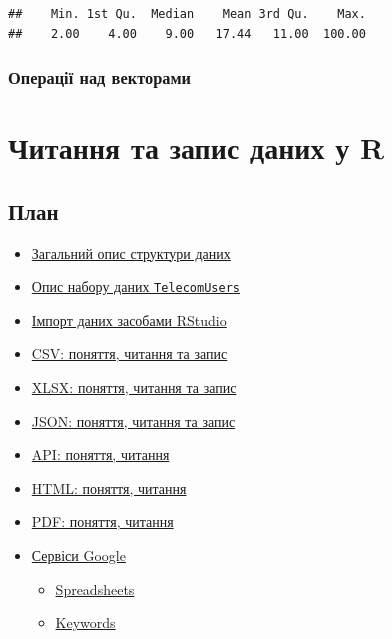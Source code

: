 \documentclass[
]{book}
\providecommand{\tightlist}{%
  \setlength{\itemsep}{0pt}\setlength{\parskip}{0pt}}
\begin{document}
\begin{verbatim}
##    Min. 1st Qu.  Median    Mean 3rd Qu.    Max. 
##    2.00    4.00    9.00   17.44   11.00  100.00
\end{verbatim}

\hypertarget{chapter323}{%
\subsection{Операції над векторами}\label{chapter323}}

\hypertarget{chapter4}{%
\chapter{Читання та запис даних у R}\label{chapter4}}

\hypertarget{ux43fux43bux430ux43d-3}{%
\section*{План}\label{ux43fux43bux430ux43d-3}}

\begin{itemize}
\tightlist
\item
  \protect\hyperlink{chapter41}{Загальний опис структури даних}
\item
  \protect\hyperlink{chapter42}{Опис набору даних \texttt{TelecomUsers}}
\item
  \protect\hyperlink{chapter43}{Імпорт даних засобами RStudio}
\item
  \protect\hyperlink{chapter42}{CSV: поняття, читання та запис}
\item
  \protect\hyperlink{chapter44}{XLSX: поняття, читання та запис}
\item
  \protect\hyperlink{chapter45}{JSON: поняття, читання та запис}
\item
  \protect\hyperlink{chapter46}{API: поняття, читання}
\item
  \protect\hyperlink{chapter47}{HTML: поняття, читання}
\item
  \protect\hyperlink{chapter48}{PDF: поняття, читання}
\item
  \protect\hyperlink{chapter48}{Сервіси Google}

  \begin{itemize}
  \tightlist
  \item
    \protect\hyperlink{chapter48}{Spreadsheets}
  \item
    \protect\hyperlink{chapter48}{Keywords}
  \end{itemize}
\end{itemize}
\end{document}

